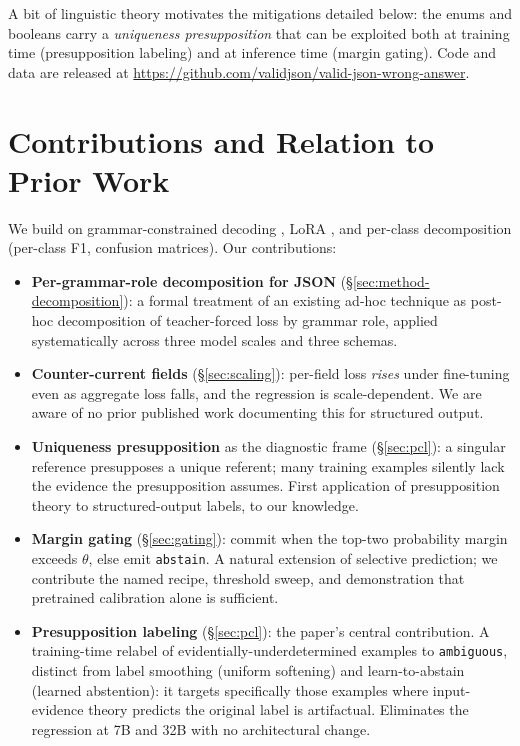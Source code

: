 \documentclass{article}
\begin{document}
A bit of linguistic theory motivates the mitigations detailed below: the enums and booleans carry a \emph{uniqueness presupposition} that can be exploited both at training time (presupposition labeling) and at inference time (margin gating). Code and data are released at \url{https://github.com/validjson/valid-json-wrong-answer}.

\section{Contributions and Relation to Prior Work}

We build on grammar-constrained decoding \cite{guidance2024,willard2023outlines,zheng2024sglang,xgrammar2024}, LoRA \cite{hu2021lora}, and per-class decomposition (per-class F1, confusion matrices). Our contributions:

\begin{itemize}
\item \textbf{Per-grammar-role decomposition for JSON} (\S\ref{sec:method-decomposition}): a formal treatment of an existing ad-hoc technique as post-hoc decomposition of teacher-forced loss by grammar role, applied systematically across three model scales and three schemas.
\item \textbf{Counter-current fields} (\S\ref{sec:scaling}): per-field loss \emph{rises} under fine-tuning even as aggregate loss falls, and the regression is scale-dependent. We are aware of no prior published work documenting this for structured output.
\item \textbf{Uniqueness presupposition} as the diagnostic frame (\S\ref{sec:pcl}): a singular reference presupposes a unique referent; many training examples silently lack the evidence the presupposition assumes. First application of presupposition theory to structured-output labels, to our knowledge.
\item \textbf{Margin gating} (\S\ref{sec:gating}): commit when the top-two probability margin exceeds $\theta$, else emit \texttt{abstain}. A natural extension of selective prediction; we contribute the named recipe, threshold sweep, and demonstration that pretrained calibration alone is sufficient.
\item \textbf{Presupposition labeling} (\S\ref{sec:pcl}): the paper's central contribution. A training-time relabel of evidentially-underdetermined examples to \texttt{ambiguous}, distinct from label smoothing (uniform softening) and learn-to-abstain (learned abstention): it targets specifically those examples where input-evidence theory predicts the original label is artifactual. Eliminates the regression at 7B and 32B with no architectural change.
\end{itemize}
\end{document}
